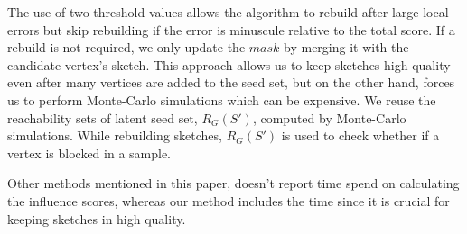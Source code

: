 \documentclass[10pt,journal,compsoc]{IEEEtran}
\begin{document}
The use of two threshold values allows the algorithm to rebuild after large local errors but skip rebuilding if the error is minuscule relative to the total score. 
If a rebuild is not required, we only update the $mask$ by merging it with the candidate vertex's sketch. 
This approach allows us to keep sketches high quality even after many vertices are added to the seed set, but on the other hand, forces us to perform Monte-Carlo simulations which can be expensive. We reuse the reachability sets of latent seed set, $R_G(S')$, computed by Monte-Carlo simulations. While rebuilding sketches, $R_G(S')$ is used to check whether if a vertex is blocked in a sample.

Other methods mentioned in this paper, doesn't report time spend on calculating the influence scores, 
whereas our method includes the time since it is crucial for keeping sketches in high quality.
\end{document}
